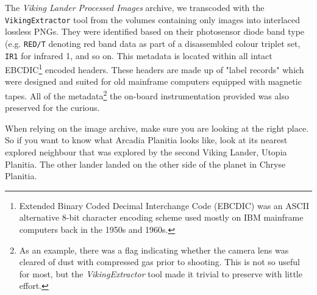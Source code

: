 The {\it Viking Lander Processed Images} archive, we transcoded with the {\tt VikingExtractor} tool from the volumes containing only images into interlaced lossless PNGs. They were identified based on their photosensor diode band type (e.g. {\tt RED/T} denoting red band data as part of a disassembled colour triplet set, {\tt IR1} for infrared 1, and so on. This metadata is located within all intact EBCDIC\footnote{Extended Binary Coded Decimal Interchange Code (EBCDIC) was an ASCII alternative 8-bit character encoding scheme used mostly on IBM mainframe computers back in the 1950s and 1960s.} encoded headers. These headers are made up of "label records" which were designed and suited for old mainframe computers equipped with magnetic tapes. All of the metadata\footnote{As an example, there was a flag indicating whether the camera lens was cleared of dust with compressed gas prior to shooting. This is not so useful for most, but the {\it VikingExtractor} tool made it trivial to preserve with little effort.} the on-board instrumentation provided was also preserved for the curious.

When relying on the image archive, make sure you are looking at the right place. So if you want to know what Arcadia Planitia looks like, look at its nearest explored neighbour that was explored by the second Viking Lander, Utopia Planitia. The other lander landed on the other side of the planet in Chryse Planitia.

\StopChapter

